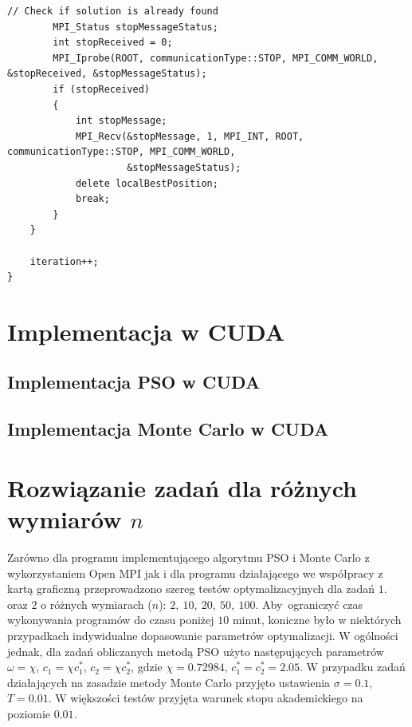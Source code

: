 \documentclass[11pt, a4paper, oneside]{article}
\begin{document}
\begin{lstlisting}[style=mycpp, label=code:pso_before, caption={Schemat komunikacji MPI w metodzie Monte Carlo.}]
        // Check if solution is already found
        MPI_Status stopMessageStatus;
        int stopReceived = 0;
        MPI_Iprobe(ROOT, communicationType::STOP, MPI_COMM_WORLD, &stopReceived, &stopMessageStatus);
        if (stopReceived)
        {
            int stopMessage;
            MPI_Recv(&stopMessage, 1, MPI_INT, ROOT, communicationType::STOP, MPI_COMM_WORLD,
                     &stopMessageStatus);
            delete localBestPosition;
            break;
        }
    }

    iteration++;
}
\end{lstlisting}
        
        
\section{Implementacja w CUDA}

\subsection{Implementacja PSO w CUDA}

\subsection{Implementacja Monte Carlo w CUDA}

\section{Rozwiązanie zadań dla różnych wymiarów $n$}

Zarówno dla programu implementującego algorytmu PSO i Monte Carlo z wykorzystaniem Open MPI jak i dla programu działającego we współpracy z kartą graficzną przeprowadzono szereg testów optymalizacyjnych dla zadań $1$. oraz $2$ o różnych wymiarach ($n$): $2, \ 10, \ 20, \ 50, \ 100$. Aby~ograniczyć czas wykonywania programów do czasu poniżej $10$ minut, koniczne było w niektórych przypadkach indywidualne dopasowanie parametrów optymalizacji. W ogólności jednak, dla zadań obliczanych metodą PSO użyto następujących parametrów $\omega = \chi$, $c_1 = \chi c_1^*$, $c_2 = \chi c_2^*$, gdzie $\chi = 0.72984$, $c_1^* = c_2^* = 2.05$. W przypadku zadań działających na zasadzie metody Monte Carlo przyjęto ustawienia $\sigma = 0.1$, $T = 0.01$. W większości testów przyjęta warunek stopu akademickiego na poziomie $0.01$.
\end{document}
